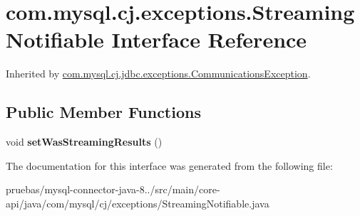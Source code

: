 \hypertarget{interfacecom_1_1mysql_1_1cj_1_1exceptions_1_1_streaming_notifiable}{}\section{com.\+mysql.\+cj.\+exceptions.\+Streaming\+Notifiable Interface Reference}
\label{interfacecom_1_1mysql_1_1cj_1_1exceptions_1_1_streaming_notifiable}


Inherited by \mbox{\hyperlink{classcom_1_1mysql_1_1cj_1_1jdbc_1_1exceptions_1_1_communications_exception}{com.\+mysql.\+cj.\+jdbc.\+exceptions.\+Communications\+Exception}}.

\subsection*{Public Member Functions}
\begin{DoxyCompactItemize}
\item 
\mbox{\label{interfacecom_1_1mysql_1_1cj_1_1exceptions_1_1_streaming_notifiable_af8d92ff2c77b5b28ee8c6076e6a0d377}} 
void {\bfseries set\+Was\+Streaming\+Results} ()
\end{DoxyCompactItemize}


The documentation for this interface was generated from the following file\+:\begin{DoxyCompactItemize}
\item 
pruebas/mysql-\/connector-\/java-\/8../src/main/core-\/api/java/com/mysql/cj/exceptions/Streaming\+Notifiable.\+java\end{DoxyCompactItemize}
